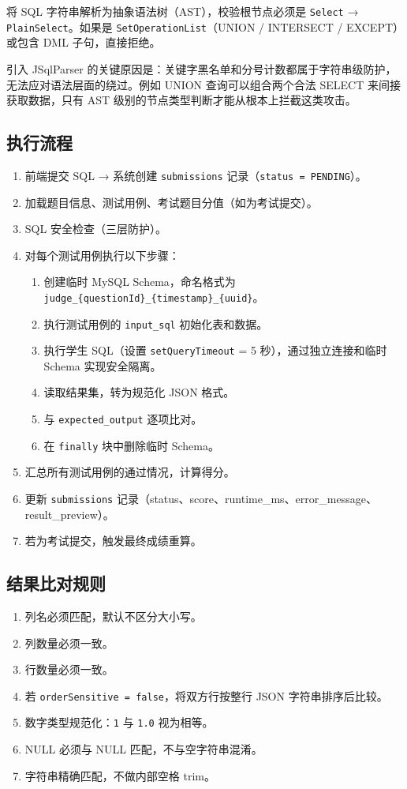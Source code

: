 \documentclass[12pt,a4paper]{ctexart}
\begin{document}
将 SQL 字符串解析为抽象语法树（AST），校验根节点必须是 \texttt{Select} → \texttt{PlainSelect}。如果是 \texttt{SetOperationList}（UNION / INTERSECT / EXCEPT）或包含 DML 子句，直接拒绝。

引入 JSqlParser 的关键原因是：关键字黑名单和分号计数都属于字符串级防护，无法应对语法层面的绕过。例如 UNION 查询可以组合两个合法 SELECT 来间接获取数据，只有 AST 级别的节点类型判断才能从根本上拦截这类攻击。

\subsection{执行流程}

\begin{enumerate}[leftmargin=2em]
  \item 前端提交 SQL → 系统创建 \texttt{submissions} 记录（\texttt{status = PENDING}）。
  \item 加载题目信息、测试用例、考试题目分值（如为考试提交）。
  \item SQL 安全检查（三层防护）。
  \item 对每个测试用例执行以下步骤：
  \begin{enumerate}
    \item 创建临时 MySQL Schema，命名格式为 \texttt{judge\_\{questionId\}\_\{timestamp\}\_\{uuid\}}。
    \item 执行测试用例的 \texttt{input\_sql} 初始化表和数据。
    \item 执行学生 SQL（设置 \texttt{setQueryTimeout} = 5 秒），通过独立连接和临时 Schema 实现安全隔离。
    \item 读取结果集，转为规范化 JSON 格式。
    \item 与 \texttt{expected\_output} 逐项比对。
    \item 在 \texttt{finally} 块中删除临时 Schema。
  \end{enumerate}
  \item 汇总所有测试用例的通过情况，计算得分。
  \item 更新 \texttt{submissions} 记录（status、score、runtime\_ms、error\_message、result\_preview）。
  \item 若为考试提交，触发最终成绩重算。
\end{enumerate}

\subsection{结果比对规则}

\begin{enumerate}[leftmargin=2em]
  \item 列名必须匹配，默认不区分大小写。
  \item 列数量必须一致。
  \item 行数量必须一致。
  \item 若 \texttt{orderSensitive = false}，将双方行按整行 JSON 字符串排序后比较。
  \item 数字类型规范化：\texttt{1} 与 \texttt{1.0} 视为相等。
  \item NULL 必须与 NULL 匹配，不与空字符串混淆。
  \item 字符串精确匹配，不做内部空格 trim。
\end{enumerate}
\end{document}
